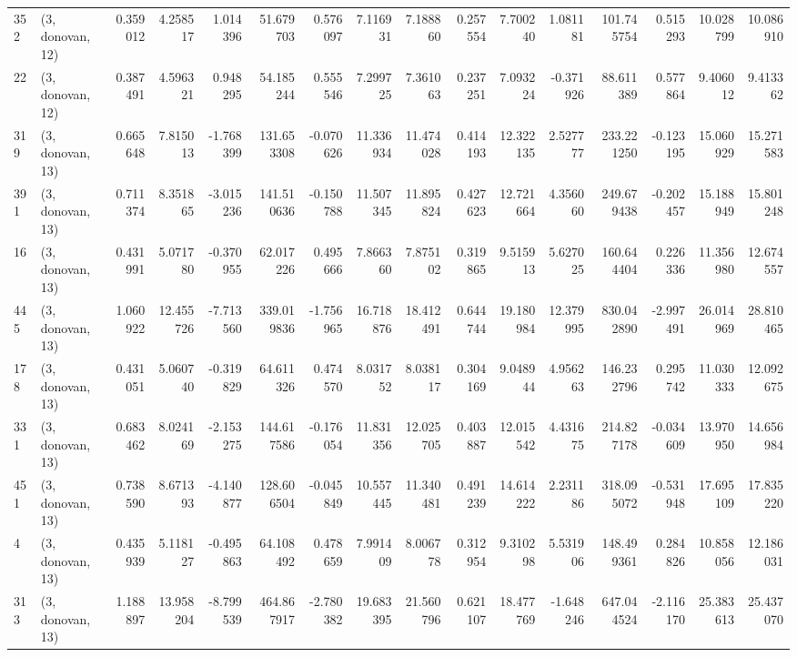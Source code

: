 \begin{tabular}{llrrrrrrrrrrrrrr}
352 &  (3, donovan, 12) &   0.359012 &   4.258517 &   1.014396 &    51.679703 &   0.576097 &   7.116931 &   7.188860 &  0.257554 &   7.700240 &   1.081181 &   101.745754 &  0.515293 &  10.028799 &  10.086910 \\
22  &  (3, donovan, 12) &   0.387491 &   4.596321 &   0.948295 &    54.185244 &   0.555546 &   7.299725 &   7.361063 &  0.237251 &   7.093224 &  -0.371926 &    88.611389 &  0.577864 &   9.406012 &   9.413362 \\
319 &  (3, donovan, 13) &   0.665648 &   7.815013 &  -1.768399 &   131.653308 &  -0.070626 &  11.336934 &  11.474028 &  0.414193 &  12.322135 &   2.527777 &   233.221250 & -0.123195 &  15.060929 &  15.271583 \\
391 &  (3, donovan, 13) &   0.711374 &   8.351865 &  -3.015236 &   141.510636 &  -0.150788 &  11.507345 &  11.895824 &  0.427623 &  12.721664 &   4.356060 &   249.679438 & -0.202457 &  15.188949 &  15.801248 \\
16  &  (3, donovan, 13) &   0.431991 &   5.071780 &  -0.370955 &    62.017226 &   0.495666 &   7.866360 &   7.875102 &  0.319865 &   9.515913 &   5.627025 &   160.644404 &  0.226336 &  11.356980 &  12.674557 \\
445 &  (3, donovan, 13) &   1.060922 &  12.455726 &  -7.713560 &   339.019836 &  -1.756965 &  16.718876 &  18.412491 &  0.644744 &  19.180984 &  12.379995 &   830.042890 & -2.997491 &  26.014969 &  28.810465 \\
178 &  (3, donovan, 13) &   0.431051 &   5.060740 &  -0.319829 &    64.611326 &   0.474570 &   8.031752 &   8.038117 &  0.304169 &   9.048944 &   4.956263 &   146.232796 &  0.295742 &  11.030333 &  12.092675 \\
331 &  (3, donovan, 13) &   0.683462 &   8.024169 &  -2.153275 &   144.617586 &  -0.176054 &  11.831356 &  12.025705 &  0.403887 &  12.015542 &   4.431675 &   214.827178 & -0.034609 &  13.970950 &  14.656984 \\
451 &  (3, donovan, 13) &   0.738590 &   8.671393 &  -4.140877 &   128.606504 &  -0.045849 &  10.557445 &  11.340481 &  0.491239 &  14.614222 &   2.231186 &   318.095072 & -0.531948 &  17.695109 &  17.835220 \\
4   &  (3, donovan, 13) &   0.435939 &   5.118127 &  -0.495863 &    64.108492 &   0.478659 &   7.991409 &   8.006778 &  0.312954 &   9.310298 &   5.531906 &   148.499361 &  0.284826 &  10.858056 &  12.186031 \\
313 &  (3, donovan, 13) &   1.188897 &  13.958204 &  -8.799539 &   464.867917 &  -2.780382 &  19.683395 &  21.560796 &  0.621107 &  18.477769 &  -1.648246 &   647.044524 & -2.116170 &  25.383613 &  25.437070 \\

\end{tabular}
